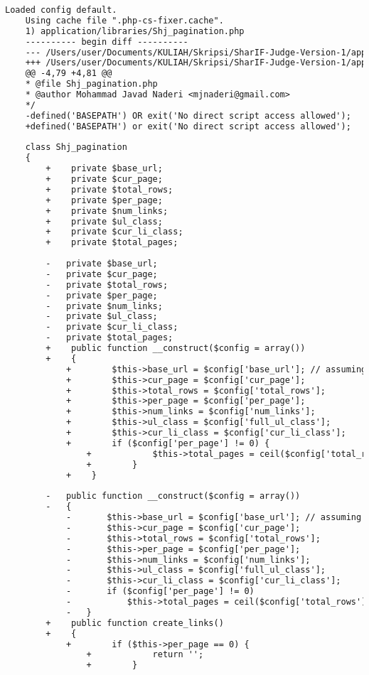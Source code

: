 \begin{lstlisting}[language=diff, caption=Perubahan pada kode Shj\_pagination.php]
	Loaded config default.
	Using cache file ".php-cs-fixer.cache".
	1) application/libraries/Shj_pagination.php
	---------- begin diff ----------
	--- /Users/user/Documents/KULIAH/Skripsi/SharIF-Judge-Version-1/application/libraries/Shj_pagination.php
	+++ /Users/user/Documents/KULIAH/Skripsi/SharIF-Judge-Version-1/application/libraries/Shj_pagination.php
	@@ -4,79 +4,81 @@
	* @file Shj_pagination.php
	* @author Mohammad Javad Naderi <mjnaderi@gmail.com>
	*/
	-defined('BASEPATH') OR exit('No direct script access allowed');
	+defined('BASEPATH') or exit('No direct script access allowed');
	
	class Shj_pagination
	{
		+    private $base_url;
		+    private $cur_page;
		+    private $total_rows;
		+    private $per_page;
		+    private $num_links;
		+    private $ul_class;
		+    private $cur_li_class;
		+    private $total_pages;
		
		-	private $base_url;
		-	private $cur_page;
		-	private $total_rows;
		-	private $per_page;
		-	private $num_links;
		-	private $ul_class;
		-	private $cur_li_class;
		-	private $total_pages;
		+    public function __construct($config = array())
		+    {
			+        $this->base_url = $config['base_url']; // assuming it has no trailing slash
			+        $this->cur_page = $config['cur_page'];
			+        $this->total_rows = $config['total_rows'];
			+        $this->per_page = $config['per_page'];
			+        $this->num_links = $config['num_links'];
			+        $this->ul_class = $config['full_ul_class'];
			+        $this->cur_li_class = $config['cur_li_class'];
			+        if ($config['per_page'] != 0) {
				+            $this->total_pages = ceil($config['total_rows'] / $config['per_page']);
				+        }
			+    }
		
		-	public function __construct($config = array())
		-	{
			-		$this->base_url = $config['base_url']; // assuming it has no trailing slash
			-		$this->cur_page = $config['cur_page'];
			-		$this->total_rows = $config['total_rows'];
			-		$this->per_page = $config['per_page'];
			-		$this->num_links = $config['num_links'];
			-		$this->ul_class = $config['full_ul_class'];
			-		$this->cur_li_class = $config['cur_li_class'];
			-		if ($config['per_page'] != 0)
			-			$this->total_pages = ceil($config['total_rows']/$config['per_page']);
			-	}
		+    public function create_links()
		+    {
			+        if ($this->per_page == 0) {
				+            return '';
				+        }
			

\end{lstlisting}
